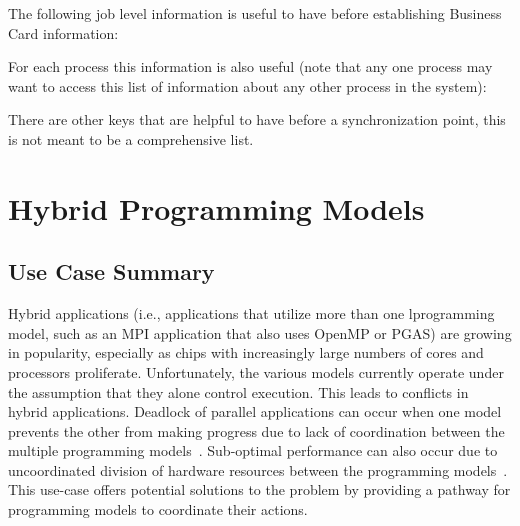 {\large {}}

{\large {}}

{\large {}}


The following job level information is useful to have before establishing Business Card information:


For each process this information is also useful (note that any one process may want to access this list of information about any other process in the system):


There are other keys that are helpful to have before a synchronization point, this is not meant to be a comprehensive list.

\section{Hybrid Programming Models}
\label{app:uc-hybrid-programming-models}

\subsection{Use Case Summary}

Hybrid applications (i.e., applications that utilize more than one lprogramming model, such as an MPI application that also uses OpenMP or PGAS) are growing in popularity, especially as chips with increasingly large numbers of cores and processors proliferate. Unfortunately, the various models currently operate under the assumption that they alone control execution. This leads to conflicts in hybrid applications. Deadlock of parallel applications can occur when one model prevents the other from making progress due to lack of coordination between the multiple programming models~\cite{2016:Hamidouche}.  Sub-optimal performance can also occur due to uncoordinated division of hardware resources between the programming models~\cite{2018:Vallee,ompix-moc}. This use-case offers potential solutions to the problem by providing a pathway for programming models to coordinate their actions.

